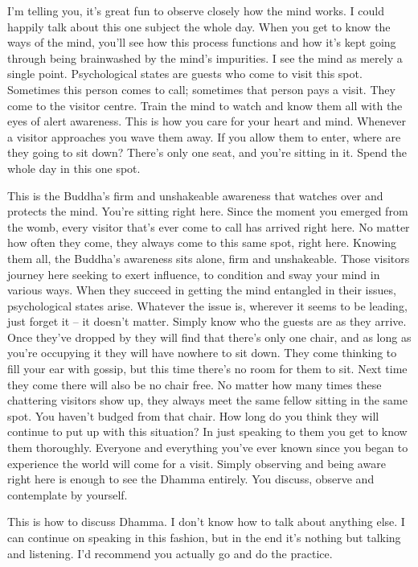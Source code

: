 I'm telling you, it's great fun to observe closely how the mind works. I could happily talk about this one subject the whole day. When you get to know the ways of the mind, you'll see how this process functions and how it's kept going through being brainwashed by the mind's impurities. I see the mind as merely a single point. Psychological states are guests who come to visit this spot. Sometimes this person comes to call; sometimes that person pays a visit. They come to the visitor centre. Train the mind to watch and know them all with the eyes of alert awareness. This is how you care for your heart and mind. Whenever a visitor approaches you wave them away. If you allow them to enter, where are they going to sit down? There's only one seat, and you're sitting in it. Spend the whole day in this one spot.

This is the Buddha's firm and unshakeable awareness that watches over and protects the mind. You're sitting right here. Since the moment you emerged from the womb, every visitor that's ever come to call has arrived right here. No matter how often they come, they always come to this same spot, right here. Knowing them all, the Buddha's awareness sits alone, firm and unshakeable. Those visitors journey here seeking to exert influence, to condition and sway your mind in various ways. When they succeed in getting the mind entangled in their issues, psychological states arise. Whatever the issue is, wherever it seems to be leading, just forget it -- it doesn't matter. Simply know who the guests are as they arrive. Once they've dropped by they will find that there's only one chair, and as long as you're occupying it they will have nowhere to sit down. They come thinking to fill your ear with gossip, but this time there's no room for them to sit. Next time they come there will also be no chair free. No matter how many times these chattering visitors show up, they always meet the same fellow sitting in the same spot. You haven't budged from that chair. How long do you think they will continue to put up with this situation? In just speaking to them you get to know them thoroughly. Everyone and everything you've ever known since you began to experience the world will come for a visit. Simply observing and being aware right here is enough to see the Dhamma entirely. You discuss, observe and contemplate by yourself.

This is how to discuss Dhamma. I don't know how to talk about anything else. I can continue on speaking in this fashion, but in the end it's nothing but talking and listening. I'd recommend you actually go and do the practice. 

